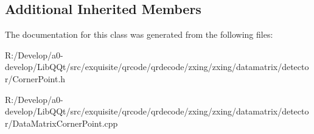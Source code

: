 \subsection*{Additional Inherited Members}


The documentation for this class was generated from the following files\+:\begin{DoxyCompactItemize}
\item 
R\+:/\+Develop/a0-\/develop/\+Lib\+Q\+Qt/src/exquisite/qrcode/qrdecode/zxing/zxing/datamatrix/detector/Corner\+Point.\+h\item 
R\+:/\+Develop/a0-\/develop/\+Lib\+Q\+Qt/src/exquisite/qrcode/qrdecode/zxing/zxing/datamatrix/detector/Data\+Matrix\+Corner\+Point.\+cpp\end{DoxyCompactItemize}
